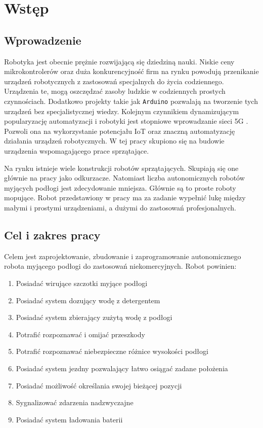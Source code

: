 \chapter{Wstęp}
	\section{Wprowadzenie}
	Robotyka jest obecnie prężnie rozwijającą się dziedziną nauki. Niskie ceny mikrokontrolerów oraz duża konkurencyjność firm na rynku powodują przenikanie urządzeń robotycznych z zastosowań specjalnych do życia codziennego. Urządzenia te, mogą oszczędzać zasoby ludzkie w codziennych prostych czynnościach.  Dodatkowo projekty takie jak \texttt{Arduino} \cite{arduinoFramework} pozwalają na tworzenie tych urządzeń bez specjalistycznej wiedzy. Kolejnym czynnikiem dynamizującym popularyzację automatyzacji i robotyki jest stopniowe wprowadzanie sieci 5G \cite{5ggov}. Pozwoli ona na wykorzystanie potencjału IoT oraz znaczną automatyzację działania urządzeń robotycznych. W tej pracy skupiono się na budowie urządzenia wspomagającego prace sprzątające.
	
	Na rynku istnieje wiele konstrukcji robotów sprzątających. Skupiają się one głównie na pracy jako odkurzacze. Natomiast liczba autonomicznych robotów myjących podłogi jest zdecydowanie mniejsza. Głównie są to proste roboty mopujące. Robot przedstawiony w pracy ma za zadanie wypełnić lukę między małymi i prostymi urządzeniami, a dużymi do zastosowań profesjonalnych.
	
	\section{Cel i zakres pracy}
	Celem jest zaprojektowanie, zbudowanie i zaprogramowanie autonomicznego robota myjącego podłogi do zastosowań niekomercyjnych.
	Robot powinien:
	\begin{enumerate}
		\item Posiadać wirujące szczotki myjące podłogi
		\item Posiadać system dozujący wodę z detergentem
		\item Posiadać system zbierający zużytą wodę z podłogi
		\item Potrafić rozpoznawać i omijać przeszkody
		\item Potrafić rozpoznawać niebezpieczne różnice wysokości podłogi
		\item Posiadać system jezdny pozwalający łatwo osiągać zadane położenia
		\item Posiadać możliwość określania swojej bieżącej pozycji
		\item Sygnalizować zdarzenia nadzwyczajne
		\item Posiadać system ładowania baterii
	\end{enumerate}
	